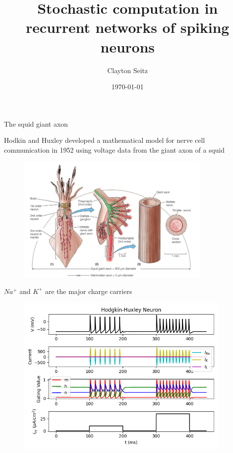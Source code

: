 \documentclass[aspectratio=169]{beamer}
\begin{document}
\title{Stochastic computation in recurrent networks of spiking neurons}  
\author{Clayton Seitz}
\date{\today} 

\maketitle

\begin{frame}{The squid giant axon}

Hodkin and Huxley developed a mathematical model for nerve cell communication in 1952 using voltage data from the giant axon of a squid

\begin{figure}
\centering
\includegraphics[width=95mm]{figure-20}
\end{figure}

\end{frame}

\begin{frame}{$Na^{+}$ and $K^{+}$ are the major charge carriers}

\begin{figure}
\centering
\includegraphics[width=105mm]{figure-19}
\end{figure}

\end{frame}
\end{document}
